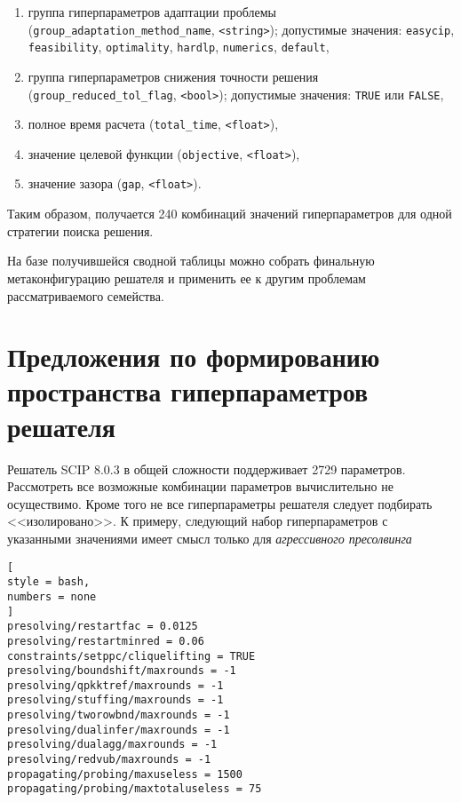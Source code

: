 \documentclass[%
	11pt,
	a4paper,
	utf8,
		]{article}
\begin{document}
\begin{enumerate}
	\item группа гиперпараметров адаптации проблемы (\verb|group_adaptation_method_name|, \verb|<string>|); допустимые значения: \verb|easycip|, \verb|feasibility|, \verb|optimality|, \verb|hardlp|, \verb|numerics|, \verb|default|,
	
	\item группа гиперпараметров снижения точности решения (\verb|group_reduced_tol_flag|, \verb|<bool>|); допустимые значения: \verb|TRUE| или \verb|FALSE|,
	
	\item полное время расчета (\verb|total_time|, \verb|<float>|),
	
	\item значение целевой функции (\verb|objective|, \verb|<float>|),
	
	\item значение зазора (\verb|gap|, \verb|<float>|).
\end{enumerate}

Таким образом, получается 240 комбинаций значений гиперпараметров для одной стратегии поиска решения.

На базе получившейся сводной таблицы можно собрать финальную метаконфигурацию решателя и применить ее к другим проблемам рассматриваемого семейства.

\section{Предложения по формированию пространства гиперпараметров решателя}

Решатель SCIP 8.0.3 в общей сложности поддерживает 2729 параметров. Рассмотреть все возможные комбинации параметров вычислительно не осуществимо. Кроме того не все гиперпараметры решателя следует подбирать <<изолировано>>. К примеру, следующий набор гиперпараметров с указанными значениями имеет смысл только для \emph{агрессивного пресолвинга}
\begin{lstlisting}[
style = bash,
numbers = none
]
presolving/restartfac = 0.0125
presolving/restartminred = 0.06
constraints/setppc/cliquelifting = TRUE
presolving/boundshift/maxrounds = -1
presolving/qpkktref/maxrounds = -1
presolving/stuffing/maxrounds = -1
presolving/tworowbnd/maxrounds = -1
presolving/dualinfer/maxrounds = -1
presolving/dualagg/maxrounds = -1
presolving/redvub/maxrounds = -1
propagating/probing/maxuseless = 1500
propagating/probing/maxtotaluseless = 75
\end{lstlisting}
\end{document}
